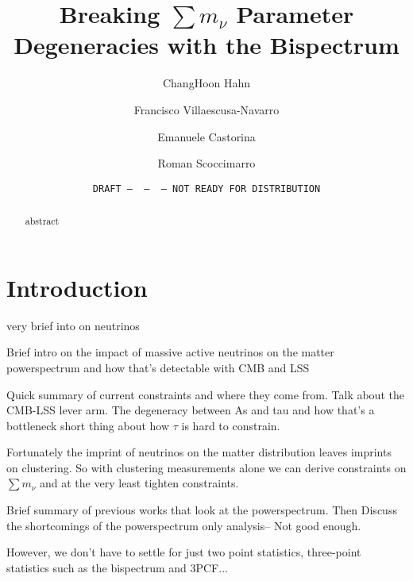 \documentclass[12pt, letterpaper, preprint]{aastex62}
\newcommand{\smnu}{\sum m_\nu}
\begin{document}
\sloppy\sloppypar\frenchspacing 

\title{Breaking $\smnu$ Parameter Degeneracies with the Bispectrum} 
\date{\texttt{DRAFT~---~\githash~---~\gitdate~---~NOT READY FOR DISTRIBUTION}}

\author{ChangHoon Hahn}

\author{Francisco Villaescusa-Navarro} 

\author{Emanuele Castorina} 

\author{Roman Scoccimarro} 

\begin{abstract}
    abstract
\end{abstract}


\section{Introduction}
very brief into on neutrinos

Brief intro on the impact of massive active neutrinos on the matter powerspectrum 
and how that's detectable with CMB and LSS


Quick summary of current constraints and where they come from. Talk about the 
CMB-LSS lever arm. The degeneracy between As and tau and how that's a bottleneck
short thing about how $\tau$ is hard to constrain.

Fortunately the imprint of neutrinos on the matter distribution leaves imprints
on clustering. So with clustering measurements alone we can derive constraints 
on $\smnu$ and at the very least tighten constraints.  

Brief summary of previous works that look at the powerspectrum. Then Discuss the 
shortcomings of the powerspectrum only analysis-- Not good enough. 

However, we don't have to settle for just two point statistics, three-point 
statistics such as the bispectrum and 3PCF... 
\end{document}
